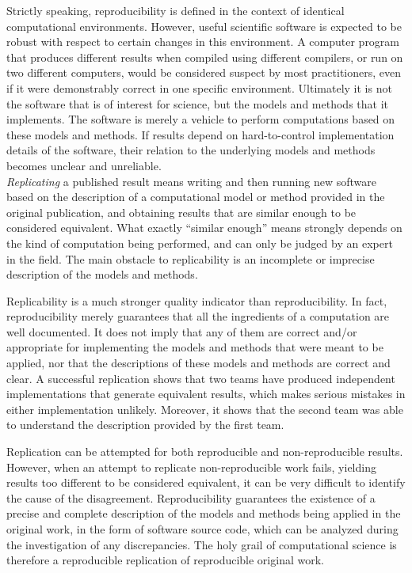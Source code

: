 \documentclass[11pt]{article}
\begin{document}
Strictly speaking, reproducibility is defined in the context of
identical computational environments. However, useful scientific
software is expected to be robust with respect to certain changes in
this environment. A computer program that produces different results
when compiled using different compilers, or run on two different
computers, would be considered suspect by most practitioners, even if
it were demonstrably correct in one specific environment. Ultimately
it is not the software that is of interest for science, but the models
and methods that it implements. The software is merely a vehicle to
perform computations based on these models and methods. If results
depend on hard-to-control implementation details of the software,
their relation to the underlying models and methods becomes unclear
and unreliable.\\

\textit{Replicating} a published result means writing and then running
new software based on the description of a computational model or
method provided in the original publication, and obtaining results
that are similar enough to be considered equivalent. What exactly
``similar enough'' means strongly depends on the kind of computation
being performed, and can only be judged by an expert in the field.
The main obstacle to replicability is an incomplete or imprecise
description of the models and methods.

Replicability is a much stronger quality indicator than
reproducibility. In fact, reproducibility merely guarantees that all
the ingredients of a computation are well documented. It does not
imply that any of them are correct and/or appropriate for implementing
the models and methods that were meant to be applied, nor that the
descriptions of these models and methods are correct and clear. A
successful replication shows that two teams have produced independent
implementations that generate equivalent results, which makes serious
mistakes in either implementation unlikely. Moreover, it shows that the
second team was able to understand the description provided by the
first team.

Replication can be attempted for both reproducible and
non-reproducible results. However, when an attempt to replicate
non-reproducible work fails, yielding results too different to be
considered equivalent, it can be very difficult to identify the cause
of the disagreement. Reproducibility guarantees the existence of a
precise and complete description of the models and methods being
applied in the original work, in the form of software source code,
which can be analyzed during the investigation of any
discrepancies. The holy grail of computational science is therefore a
reproducible replication of reproducible original work.
\end{document}
